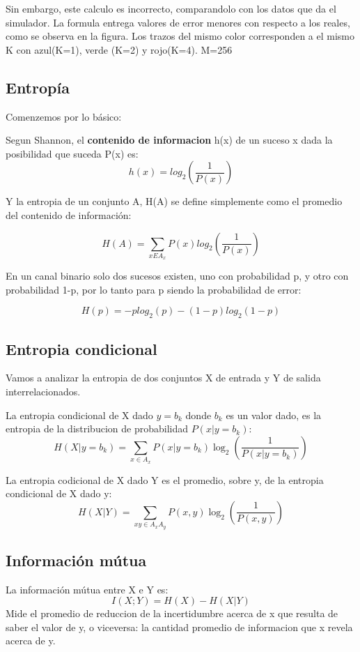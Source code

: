 Sin embargo, este calculo es incorrecto, comparandolo con los datos que da el simulador. La formula entrega valores de error menores con respecto a los reales, como se observa en la figura. 
Los trazos del mismo color corresponden a el mismo K con azul(K=1), verde (K=2) y rojo(K=4). M=256

\subsection{Entropía}

Comenzemos por lo básico:

Segun Shannon, el \textbf{contenido de informacion} h(x) de un suceso x dada la posibilidad que suceda P(x) es:
$$ h(x) = log_{2}\left(\frac{1}{P(x)}\right) $$

Y la entropia de un conjunto A, H(A) se define simplemente como el promedio del contenido de información:

$$ H(A) = \sum_{x E A_{x}} P(x)log_{2}\left(\frac{1}{P(x)}\right)$$

En un canal binario solo dos sucesos existen, uno con probabilidad p, y otro con probabilidad 1-p, por lo tanto para p siendo la probabilidad de error:

$$ H(p) = -p log_{2}(p)-(1-p)log_{2}(1-p) $$

\subsection{Entropia condicional}

Vamos a analizar la entropia de dos conjuntos X de entrada y Y de salida interrelacionados.

La entropia condicional de X dado $y=b_k$ donde $b_k$ es un valor dado, es la entropia de la distribucion de probabilidad $P(x|y=b_{k})$:
$$H(X|y=b_{k}) = \sum_{x \in A_{x}} P(x | y=b_{k})\log_2\left(\frac{1}{P(x | y=b_{k})}\right) $$

La entropia codicional de X dado Y es el promedio, sobre y, de la entropia condicional de X dado y:
$$H(X|Y) =  \sum_{xy \in A_{x}A_{y}} P(x,y)\log_2\left(\frac{1}{P(x,y)}\right) $$

\subsection{Información mútua}
La información mútua entre X e Y es:
$$I(X;Y) = H(X)-H(X|Y)$$
Mide el promedio de reduccion de la incertidumbre acerca de x que resulta de saber el valor de y, o viceversa: la cantidad promedio de informacion que x revela acerca de y.


